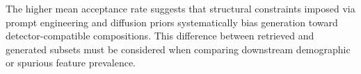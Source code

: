 The higher mean acceptance rate suggests that structural constraints imposed via prompt engineering and diffusion priors systematically bias generation toward detector-compatible compositions. This difference between retrieved and generated subsets must be considered when comparing downstream demographic or spurious feature prevalence.


\section{}

